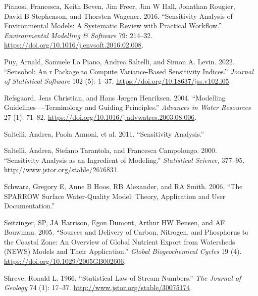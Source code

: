 \begin{CSLReferences}{1}{0}
\leavevmode{}%
Pianosi, Francesca, Keith Beven, Jim Freer, Jim W Hall, Jonathan Rougier, David B Stephenson, and Thorsten Wagener. 2016. {``Sensitivity Analysis of Environmental Models: A Systematic Review with Practical Workflow.''} \emph{Environmental Modelling \& Software} 79: 214--32. \url{https://doi.org/10.1016/j.envsoft.2016.02.008}.

\leavevmode{}%
Puy, Arnald, Samuele Lo Piano, Andrea Saltelli, and Simon A. Levin. 2022. {``Sensobol: An r Package to Compute Variance-Based Sensitivity Indices.''} \emph{Journal of Statistical Software} 102 (5): 1--37. \url{https://doi.org/10.18637/jss.v102.i05}.

\leavevmode{}%
Refsgaard, Jens Christian, and Hans Jørgen Henriksen. 2004. {``Modelling Guidelines----Terminology and Guiding Principles.''} \emph{Advances in Water Resources} 27 (1): 71--82. \url{https://doi.org/10.1016/j.advwatres.2003.08.006}.

\leavevmode{}%
Saltelli, Andrea, Paola Annoni, et al. 2011. {``Sensitivity Analysis.''}

\leavevmode{}%
Saltelli, Andrea, Stefano Tarantola, and Francesca Campolongo. 2000. {``Sensitivity Analysis as an Ingredient of Modeling.''} \emph{Statistical Science}, 377--95. \url{http://www.jstor.org/stable/2676831}.

\leavevmode{}%
Schwarz, Gregory E, Anne B Hoos, RB Alexander, and RA Smith. 2006. {``The SPARROW Surface Water-Quality Model: Theory, Application and User Documentation.''}

\leavevmode{}%
Seitzinger, SP, JA Harrison, Egon Dumont, Arthur HW Beusen, and AF Bouwman. 2005. {``Sources and Delivery of Carbon, Nitrogen, and Phosphorus to the Coastal Zone: An Overview of Global Nutrient Export from Watersheds ({NEWS}) Models and Their Application.''} \emph{Global Biogeochemical Cycles} 19 (4). \url{https://doi.org/10.1029/2005GB002606}.

\leavevmode{}%
Shreve, Ronald L. 1966. {``Statistical Law of Stream Numbers.''} \emph{The Journal of Geology} 74 (1): 17--37. \url{http://www.jstor.org/stable/30075174}.


\end{CSLReferences}
